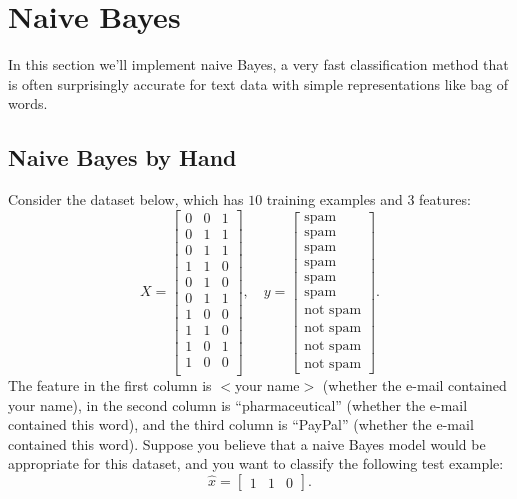 \documentclass{article}
\begin{document}
\section{Naive Bayes}

In this section we'll implement naive Bayes, a very fast classification method that is often surprisingly accurate for text data with simple representations like bag of words.



\subsection{Naive Bayes by Hand}

Consider the dataset below, which has $10$ training examples and $3$ features:
\[
X = \begin{bmatrix}0 & 0 & 1\\0 & 1 & 1\\ 0 & 1 & 1\\ 1 & 1 & 0\\0 & 1 & 0\\0 & 1 & 1\\1 & 0 & 0\\1 & 1 & 0\\1 & 0 & 1\\1 & 0 & 0\\\end{bmatrix}, \quad y = \begin{bmatrix}\text{spam}\\\text{spam}\\\text{spam}\\\text{spam}\\\text{spam}\\\text{spam}\\\text{not spam}\\\text{not spam}\\\text{not spam}\\\text{not spam}\end{bmatrix}.
\]
The feature in the first column is $<$your name$>$ (whether the e-mail contained your name), in the second column is ``pharmaceutical'' (whether the e-mail contained this word), and the third column is ``PayPal'' (whether the e-mail contained this word).
Suppose you believe that a naive Bayes model would be appropriate for this dataset, and you want to classify the following test example:
\[
\hat{x} = \begin{bmatrix}1 & 1 & 0\end{bmatrix}.
\]
\end{document}
